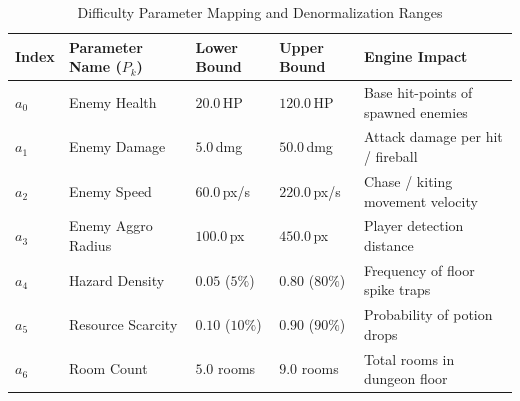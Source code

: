 \begin{table}[!htbp]
\centering
\caption{Difficulty Parameter Mapping and Denormalization Ranges}
\label{tab:param_ranges}
\small
\begin{tabular}{p{}p{}p{}p{}p{}}
\toprule
\textbf{Index} & \textbf{Parameter Name ($P_k$)} & \textbf{Lower Bound} & \textbf{Upper Bound} & \textbf{Engine Impact} \\
\midrule
$a_0$ & Enemy Health & $20.0$\,HP & $120.0$\,HP & Base hit-points of spawned enemies \\
$a_1$ & Enemy Damage & $5.0$\,dmg & $50.0$\,dmg & Attack damage per hit / fireball \\
$a_2$ & Enemy Speed & $60.0$\,px/s & $220.0$\,px/s & Chase / kiting movement velocity \\
$a_3$ & Enemy Aggro Radius & $100.0$\,px & $450.0$\,px & Player detection distance \\
$a_4$ & Hazard Density & $0.05$ ($5\%$) & $0.80$ ($80\%$) & Frequency of floor spike traps \\
$a_5$ & Resource Scarcity & $0.10$ ($10\%$) & $0.90$ ($90\%$) & Probability of potion drops \\
$a_6$ & Room Count & $5.0$ rooms & $9.0$ rooms & Total rooms in dungeon floor \\
\bottomrule
\end{tabular}
\end{table}

